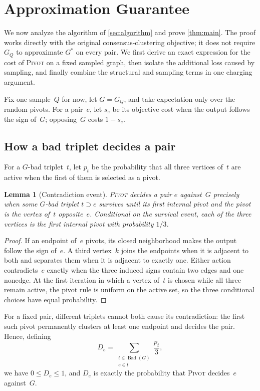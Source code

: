 \documentclass[11pt,letterpaper]{article}
\newtheorem{lemma}[theorem]{Lemma}
\theoremstyle{definition}
\theoremstyle{remark}
\newcommand{\Bad}{\operatorname{Bad}}
\newcommand{\1}{\mathbf{1}}
\newcommand{\Pivot}{\textnormal{\textsc{Pivot}}}
\begin{document}
\section{Approximation Guarantee}
\label{sec:analysis}

We now analyze the algorithm of \cref{sec:algorithm} and prove \cref{thm:main}.  The proof works directly with the original consensus-clustering objective; it does not require $G_Q$ to approximate $G^*$ on every pair.  We first derive an exact expression for the cost of \Pivot{} on a fixed sampled graph, then isolate the additional loss caused by sampling, and finally combine the structural and sampling terms in one charging argument.

Fix one sample~$Q$ for now, let $G=G_Q$, and take expectation only over the random pivots.  For a pair~$e$, let $s_e$ be its objective cost when the output follows the sign of~$G$; opposing~$G$ costs $1-s_e$.

\subsection{How a bad triplet decides a pair}

For a $G$-bad triplet~$t$, let $p_t$ be the probability that all three vertices of~$t$ are active when the first of them is selected as a pivot.

\begin{lemma}[Contradiction event]\label{lem:contradiction}
\Pivot{} decides a pair $e$ against~$G$ precisely when some $G$-bad triplet $t\supset e$ survives until its first internal pivot and the pivot is the vertex of~$t$ opposite~$e$.  Conditional on the survival event, each of the three vertices is the first internal pivot with probability $1/3$.
\end{lemma}

\begin{proof}
If an endpoint of~$e$ pivots, its closed neighborhood makes the output follow the sign of~$e$.  A third vertex~$k$ joins the endpoints when it is adjacent to both and separates them when it is adjacent to exactly one.  Either action contradicts~$e$ exactly when the three induced signs contain two edges and one nonedge.  At the first iteration in which a vertex of~$t$ is chosen while all three remain active, the pivot rule is uniform on the active set, so the three conditional choices have equal probability.
\end{proof}

For a fixed pair, different triplets cannot both cause its contradiction: the first such pivot permanently clusters at least one endpoint and decides the pair.  Hence, defining
\begin{equation}\label{eq:De}
 D_e=\sum_{\substack{t\in\Bad(G)\\e\in t}}\frac{p_t}{3},
\end{equation}
we have $0\le D_e\le1$, and $D_e$ is exactly the probability that \Pivot{} decides~$e$ against~$G$.
\end{document}
